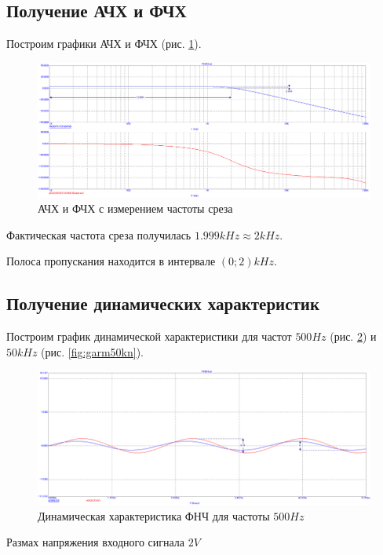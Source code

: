 \documentclass[a4paper,14pt]{article}
\begin{document}
\subsection{Получение АЧХ и ФЧХ}

Построим графики АЧХ и ФЧХ (рис. \ref{fig:afchn}).

\begin{figure}[H]
	\centering
	\includegraphics[width=0.85\linewidth]{../imgs/FNCH/AFcH_N}
	\caption{АЧХ и ФЧХ с измерением частоты среза}
	\label{fig:afchn}
\end{figure}

Фактическая частота среза получилась $1.999kHz \approx 2kHz$.

Полоса пропускания находится в интервале $(0;2)kHz$.

\subsection{Получение динамических характеристик}

Построим график динамической характеристики для частот $500Hz$ (рис. \ref{fig:garm500n}) и $50kHz$ (рис. \ref{fig:garm50kn}).

\begin{figure}[H]
	\centering
	\includegraphics[width=0.95\linewidth]{../imgs/FNCH/garm_500_N}
	\caption{Динамическая характеристика ФНЧ для частоты $500Hz$}
	\label{fig:garm500n}
\end{figure}

Размах напряжения входного сигнала $2V$
\end{document}
